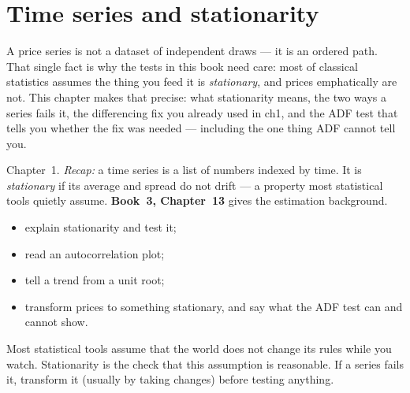 \chapter{Time series and stationarity}\label{ch:ts}
A price series is not a dataset of independent draws --- it is an
ordered path. That single fact is why the tests in this book need
care: most of classical statistics assumes the thing you feed it is
\emph{stationary}, and prices emphatically are not. This chapter
makes that precise: what stationarity means, the two ways a series
fails it, the differencing fix you already used in ch1, and the ADF
test that tells you whether the fix was needed --- including the one
thing ADF cannot tell you.

\begin{rulebox}
Chapter~1. \emph{Recap:} a time series is a list of numbers indexed by time. It is \emph{stationary} if its average and spread do not drift --- a property most statistical tools quietly assume. \textbf{Book~3, Chapter~13} gives the estimation background.
\end{rulebox}
\begin{wins}
\begin{itemize}
\item explain stationarity and test it;
\item read an autocorrelation plot;
\item tell a trend from a unit root;
\item transform prices to something stationary, and say what the ADF test can and cannot show.
\end{itemize}
\end{wins}
\begin{principle}
Most statistical tools assume that the world does not change its rules while you watch. Stationarity is the check that this assumption is reasonable. If a series fails it, transform it (usually by taking changes) before testing anything.
\end{principle}


